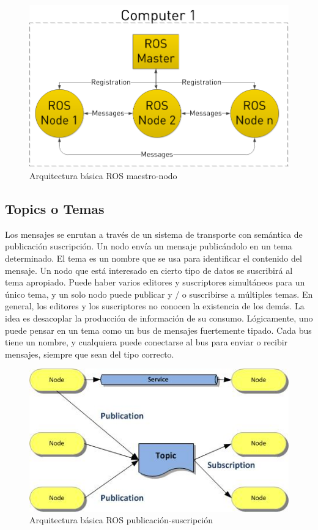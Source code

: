 \begin{figure}[H]
    \centering
    \includegraphics[scale=0.45]{img/ros-architecture.png}
  	\caption{Arquitectura básica ROS maestro-nodo}
  	\label{fig:ros-arch}
\end{figure}

\subsection{Topics o Temas}
Los mensajes se enrutan a través de un sistema de transporte con semántica de publicación suscripción. Un nodo envía un mensaje publicándolo en un tema determinado. El tema es un nombre que se usa para identificar el contenido del mensaje. Un nodo que está interesado en cierto tipo de datos se suscribirá al tema apropiado. Puede haber varios editores y suscriptores simultáneos para un único tema, y un solo nodo puede publicar y / o suscribirse a múltiples temas. En general, los editores y los suscriptores no conocen la existencia de los demás. La idea es desacoplar la producción de información de su consumo. Lógicamente, uno puede pensar en un tema como un bus de mensajes fuertemente tipado. Cada bus tiene un nombre, y cualquiera puede conectarse al bus para enviar o recibir mensajes, siempre que sean del tipo correcto.

\begin{figure}[H]
    \centering
    \includegraphics[scale=1]{img/ros-architecture-3.jpg}
  	\caption{Arquitectura básica ROS publicación-suscripción}
  	\label{fig:ros-servicio}
\end{figure}

